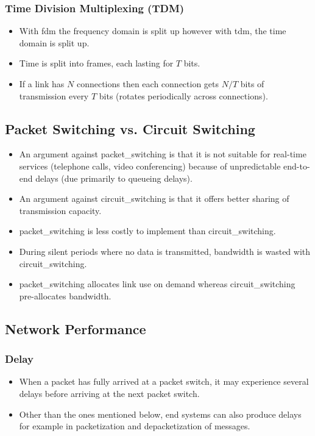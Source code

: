 \documentclass{article}
\begin{document}
\subsubsection{Time Division Multiplexing (TDM)}

\begin{itemize}
    \item With \gls*{fdm} the frequency domain is split up however with \gls{tdm}, the time domain is split up.
    \item Time is split into frames, each lasting for $T$ bits.
    \item If a link has $N$ connections then each connection gets $N/T$ bits of transmission every $T$ bits (rotates periodically across connections).
\end{itemize}

\subsection{Packet Switching vs. Circuit Switching}

\begin{itemize}
    \item An argument against \gls*{packet_switching} is that it is not suitable for real-time services (telephone calls, video conferencing) because of unpredictable end-to-end delays (due primarily to queueing delays).
    \item An argument against \gls*{circuit_switching} is that it offers better sharing of transmission capacity.
    \item \Gls*{packet_switching} is less costly to implement than \gls*{circuit_switching}.
    \item During silent periods where no data is transmitted, bandwidth is wasted with \gls*{circuit_switching}.
    \item \Gls{packet_switching} allocates link use on demand whereas \gls*{circuit_switching} pre-allocates bandwidth.
\end{itemize}

\subsection{Network Performance}

\subsubsection{Delay}

\begin{itemize}
    \item When a packet has fully arrived at a packet switch, it may experience several delays before arriving at the next packet switch.
    \item Other than the ones mentioned below, end systems can also produce delays for example in packetization and depacketization of messages.
\end{itemize}
\end{document}
